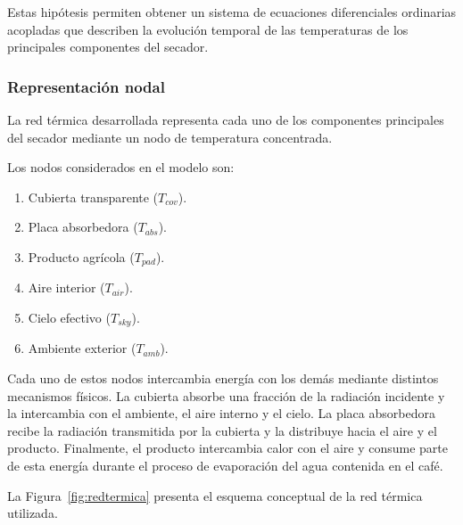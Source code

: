 Estas hipótesis permiten obtener un sistema de ecuaciones diferenciales ordinarias acopladas que describen la evolución temporal de las temperaturas de los principales componentes del secador.

\subsubsection{Representación nodal}

La red térmica desarrollada representa cada uno de los componentes principales del secador mediante un nodo de temperatura concentrada.

Los nodos considerados en el modelo son:

\begin{enumerate}

\item Cubierta transparente ($T_{cov}$).

\item Placa absorbedora ($T_{abs}$).

\item Producto agrícola ($T_{pad}$).

\item Aire interior ($T_{air}$).

\item Cielo efectivo ($T_{sky}$).

\item Ambiente exterior ($T_{amb}$).

\end{enumerate}

Cada uno de estos nodos intercambia energía con los demás mediante distintos mecanismos físicos. La cubierta absorbe una fracción de la radiación incidente y la intercambia con el ambiente, el aire interno y el cielo. La placa absorbedora recibe la radiación transmitida por la cubierta y la distribuye hacia el aire y el producto. Finalmente, el producto intercambia calor con el aire y consume parte de esta energía durante el proceso de evaporación del agua contenida en el café.

La Figura~\ref{fig:redtermica} presenta el esquema conceptual de la red térmica utilizada.

